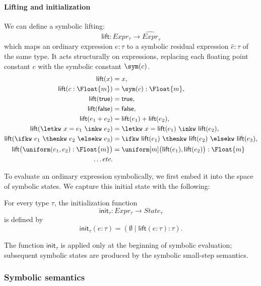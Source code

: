 \paragraph{Lifting and initialization}
We can define a symbolic lifting:
\[
\mathsf{lift} :
Expr_\tau \longrightarrow \widehat{Expr}_\tau
\]
which maps an ordinary expression $e : \tau$ to a symbolic residual expression $\hat e : \tau$ of the same type. It acts structurally on expressions, replacing each floating point constant $c$ with the symbolic constant $\sym(c)$.
\begin{align*}
\mathsf{lift}(x) &= x,\\
\mathsf{lift}(c:\Float{m}) &= \sym(c):\Float{m},\\
\mathsf{lift}(\mathsf{true}) &= \mathsf{true},\\
\mathsf{lift}(\mathsf{false}) &= \mathsf{false},\\
\mathsf{lift}(e_1+e_2)
  &= \mathsf{lift}(e_1)+\mathsf{lift}(e_2),\\
\mathsf{lift}(\letkw\ x=e_1\ \inkw\ e_2)
  &=\letkw\ x=\mathsf{lift}(e_1)\
    \inkw\ \mathsf{lift}(e_2),\\
\mathsf{lift}(\ifkw\ e_1\ \thenkw\ e_2\ \elsekw\ e_3)
  &=\ifkw\ \mathsf{lift}(e_1)\
    \thenkw\ \mathsf{lift}(e_2)\
    \elsekw\ \mathsf{lift}(e_3),\\
\mathsf{lift}\bigl(
  \uniform(e_1,e_2):\Float{m}
\bigr)
  &=
  \uniform[m]\bigl(
    \mathsf{lift}(e_1),
    \mathsf{lift}(e_2)
  \bigr):\Float{m} \\
  \ldots etc.
\end{align*}

To evaluate an ordinary expression symbolically, we first embed it into the space of symbolic states. We capture this initial state with the following:

\begin{definition}[Initialization]
  For every type $\tau$, the initialization function
  \[
    \mathsf{init}_\tau:
    Expr_\tau \to State_\tau
  \]
  is defined by
  \[
    \mathsf{init}_\tau(e:\tau)
    =
    (\emptyset\mid\mathsf{lift}(e:\tau):\tau).
  \]
\end{definition}

The function $\mathsf{init}_\tau$ is applied only at the beginning of symbolic
evaluation; subsequent symbolic states are produced by the symbolic small-step
semantics.

\subsubsection{Symbolic semantics}

